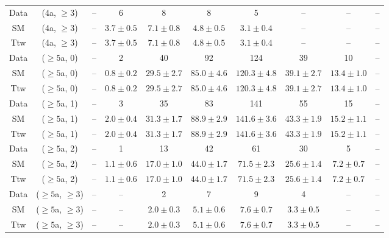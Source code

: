 \begin{table}[h!]
{\begin{tabular}{cccccccccc}
	Data & (4a, $\ge3$) & -- & 6 & 8 & 8 & 5 & -- & -- & -- \\[0.5ex] 
	SM & (4a, $\ge3$) & -- & $3.7\pm 0.5$ & $7.1\pm 0.8$ & $4.8\pm 0.5$ & $3.1\pm 0.4$ & -- & -- & -- \\[0.5ex] 
	Ttw & (4a, $\ge3$) & -- & $3.7\pm 0.5$ & $7.1\pm 0.8$ & $4.8\pm 0.5$ & $3.1\pm 0.4$ & -- & -- & -- \\[0.5ex] 
	Data & ($\ge5$a, 0) & -- & 2 & 40 & 92 & 124 & 39 & 10 & -- \\[0.5ex] 
	SM & ($\ge5$a, 0) & -- & $0.8\pm 0.2$ & $29.5\pm 2.7$ & $85.0\pm 4.6$ & $120.3\pm 4.8$ & $39.1\pm 2.7$ & $13.4\pm 1.0$ & -- \\[0.5ex] 
	Ttw & ($\ge5$a, 0) & -- & $0.8\pm 0.2$ & $29.5\pm 2.7$ & $85.0\pm 4.6$ & $120.3\pm 4.8$ & $39.1\pm 2.7$ & $13.4\pm 1.0$ & -- \\[0.5ex] 
	Data & ($\ge5$a, 1) & -- & 3 & 35 & 83 & 141 & 55 & 15 & -- \\[0.5ex] 
	SM & ($\ge5$a, 1) & -- & $2.0\pm 0.4$ & $31.3\pm 1.7$ & $88.9\pm 2.9$ & $141.6\pm 3.6$ & $43.3\pm 1.9$ & $15.2\pm 1.1$ & -- \\[0.5ex] 
	Ttw & ($\ge5$a, 1) & -- & $2.0\pm 0.4$ & $31.3\pm 1.7$ & $88.9\pm 2.9$ & $141.6\pm 3.6$ & $43.3\pm 1.9$ & $15.2\pm 1.1$ & -- \\[0.5ex] 
	Data & ($\ge5$a, 2) & -- & 1 & 13 & 42 & 61 & 30 & 5 & -- \\[0.5ex] 
	SM & ($\ge5$a, 2) & -- & $1.1\pm 0.6$ & $17.0\pm 1.0$ & $44.0\pm 1.7$ & $71.5\pm 2.3$ & $25.6\pm 1.4$ & $7.2\pm 0.7$ & -- \\[0.5ex] 
	Ttw & ($\ge5$a, 2) & -- & $1.1\pm 0.6$ & $17.0\pm 1.0$ & $44.0\pm 1.7$ & $71.5\pm 2.3$ & $25.6\pm 1.4$ & $7.2\pm 0.7$ & -- \\[0.5ex] 
	Data & ($\ge5$a, $\ge3$) & -- & -- & 2 & 7 & 9 & 4 & -- & -- \\[0.5ex] 
	SM & ($\ge5$a, $\ge3$) & -- & -- & $2.0\pm 0.3$ & $5.1\pm 0.6$ & $7.6\pm 0.7$ & $3.3\pm 0.5$ & -- & -- \\[0.5ex] 
	Ttw & ($\ge5$a, $\ge3$) & -- & -- & $2.0\pm 0.3$ & $5.1\pm 0.6$ & $7.6\pm 0.7$ & $3.3\pm 0.5$ & -- & -- \\[0.5ex] 
	\hline
	\hline
\end{tabular}}
\end{table}
